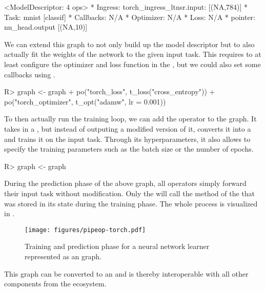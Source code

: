 \documentclass[article]{jss}
\theoremstyle{definition}
\begin{document}
\begin{CodeOutput}
<ModelDescriptor: 4 ops>
* Ingress:  torch_ingress_ltnsr.input: [(NA,784)]
* Task:  mnist [classif]
* Callbacks:  N/A
* Optimizer:  N/A
* Loss:  N/A
* pointer:  nn_head.output [(NA,10)]
\end{CodeOutput}

We can extend this graph to not only build up the model descriptor but to also actually fit the weights of the network to the given input task.
This requires to at least configure the optimizer and loss function in the , but we could also set some callbacks using .

\begin{CodeInput}
R> graph <- graph %
+    po("torch_loss", t_loss("cross_entropy")) %
+    po("torch_optimizer", t_opt("adamw", lr = 0.001))
\end{CodeInput}

To then actually run the training loop, we can add the  operator to the graph.
It takes in a , but instead of outputing a modified version of it, converts it into a  and trains it on the input task.
Through its hyperparameters, it also allows to specify the training parameters such as the batch size or the number of epochs.

\begin{CodeInput}
R> graph <- graph %
\end{CodeInput}

During the prediction phase of the above graph, all  operators simply forward their input task without modification.
Only the  will call the  method of the  that was stored in its state during the training phase.
The whole process is visualized in .

\begin{figure}
    \centering
    \texttt{[image: figures/pipeop-torch.pdf]}
    \caption{Training and prediction phase for a neural network learner represented as an \mlrtpipelines{} graph.}
    \label{fig:pipeop-torch}
\end{figure}

This graph can be converted to an  and is thereby interoperable with all other components from the  ecosystem.
\end{document}

